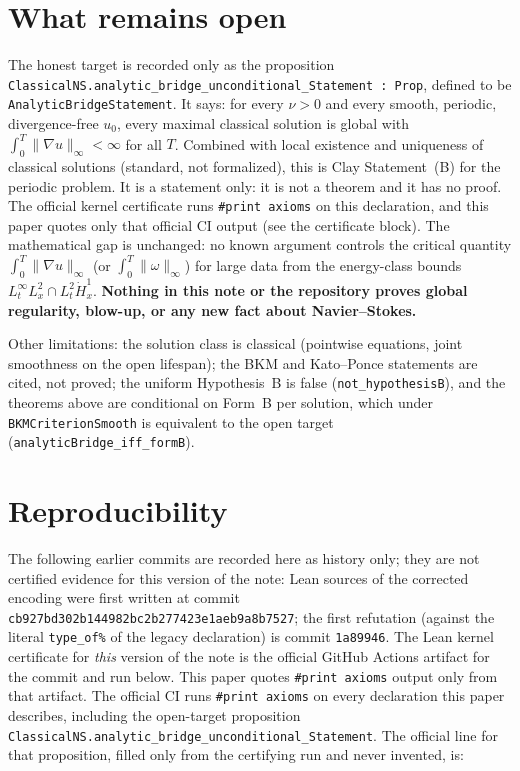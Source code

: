 \documentclass[11pt]{article}
\theoremstyle{definition}
\newcommand{\lean}[1]{\texttt{#1}}
\begin{document}
\section{What remains open}
The honest target is recorded only as the proposition
\lean{ClassicalNS.analytic\_bridge\_unconditional\_Statement : Prop}, defined to be
\lean{AnalyticBridgeStatement}. It says: for every $\nu>0$ and every smooth, periodic,
divergence-free $u_0$, every maximal classical solution is global with
$\int_0^T\|\nabla u\|_\infty<\infty$ for all $T$. Combined with local existence and
uniqueness of classical solutions (standard, not formalized), this is Clay Statement~(B)
for the periodic problem. It is a statement only: it is not a theorem and it has no
proof. The official kernel certificate runs \lean{\#print axioms} on this declaration,
and this paper quotes only that official CI output (see the certificate block).
The mathematical gap is unchanged: no known argument controls
the critical quantity $\int_0^T\|\nabla u\|_\infty$ (or
$\int_0^T\|\omega\|_\infty$) for large data from the energy-class bounds
$L^\infty_tL^2_x\cap L^2_t\dot H^1_x$. \textbf{Nothing in this note or the repository
proves global regularity, blow-up, or any new fact about Navier--Stokes.}

Other limitations: the solution class is classical (pointwise equations, joint
smoothness on the open lifespan); the BKM and Kato--Ponce statements are cited, not
proved; the uniform Hypothesis~B is false (\lean{not\_hypothesisB}), and the theorems
above are conditional on Form~B per solution, which under \lean{BKMCriterionSmooth} is
equivalent to the open target (\lean{analyticBridge\_iff\_formB}).

\section{Reproducibility}
The following earlier commits are recorded here as history only; they are not
certified evidence for this version of the note: Lean sources of the corrected
encoding were first written at commit
\lean{cb927bd302b144982bc2b277423e1aeb9a8b7527}; the first refutation (against the
literal \lean{type\_of\%} of the legacy declaration) is commit \lean{1a89946}.
The Lean kernel certificate for \emph{this} version of the note is the official
GitHub Actions artifact for the commit and run below. This paper quotes
\lean{\#print axioms} output only from that artifact. The official CI runs
\lean{\#print axioms} on every declaration this paper describes, including the
open-target proposition \lean{ClassicalNS.analytic\_bridge\_unconditional\_Statement}.
The official line for that proposition, filled only from the certifying run and
never invented, is:
\begin{quote}
\texttt{\CertPrintAxiomsOpenTarget}
\end{quote}
\end{document}

